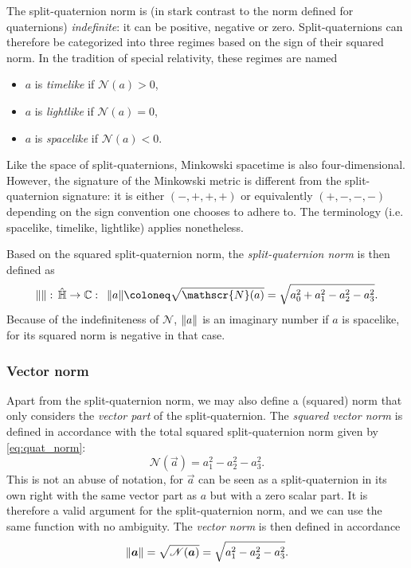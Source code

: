 The split-quaternion norm is (in stark contrast to the norm defined for quaternions) \emph{indefinite}: it can be positive, negative or zero. Split-quaternions can therefore be categorized into three regimes based on the sign of their squared norm. In the tradition of special relativity, these regimes are named
\begin{itemize}
    \item $a$ is \emph{timelike} if \( \mathscr{N}(a) > 0 \),
    \item $a$ is \emph{lightlike} if \( \mathscr{N}(a) = 0 \), 
    \item $a$ is \emph{spacelike} if \( \mathscr{N}(a) < 0 \).
\end{itemize}
Like the space of split-quaternions, Minkowski spacetime is also four-dimensional. However, the signature of the Minkowski metric is different from the split-quaternion signature: it is either \((-, +, +, +)\) or equivalently \( (+, -, -, -)\) depending on the sign convention one chooses to adhere to. The terminology (i.e. spacelike, timelike, lightlike) applies nonetheless. \cite{Misner1970,Landau1971}

Based on the squared split-quaternion norm, the \emph{split-quaternion norm} is then defined as
\begin{equation}
     \norm{}:\, \spquaternions \to \complex: \;\: \norm{a} \coloneq \sqrt{\mathscr{N}(a)} = \sqrt{a_0^2 + a_1^2 - a_2^2 - a_3^2}.
\end{equation}
Because of the indefiniteness of $\mathscr{N}$, $\norm{a}$ is an imaginary number if $a$ is spacelike, for its squared norm is negative in that case.

\subsubsection{Vector norm}
Apart from the split-quaternion norm, we may also define a (squared) norm that only considers the \emph{vector part} of the split-quaternion. The \emph{squared vector norm} is defined in accordance with the total squared split-quaternion norm given by \cref{eq:quat_norm}:
\begin{equation}
     \mathscr{N}(\vec{a}) = a_1^2 - a^2_2 - a^2_3.
     \label{eq:vector_norm}
\end{equation}
This is not an abuse of notation, for \(\vec{a}\) can be seen as a split-quaternion in its own right with the same vector part as \(a\) but with a zero scalar part. It is therefore a valid argument for the split-quaternion norm, and we can use the same function with no ambiguity. The \emph{vector norm} is then defined in accordance 
\begin{equation}
    \norm{\vec{a}} = \sqrt{\mathscr{N}(\vec{a})} = \sqrt{a_1^2 - a_2^2 - a_3^2}. 
\end{equation}

